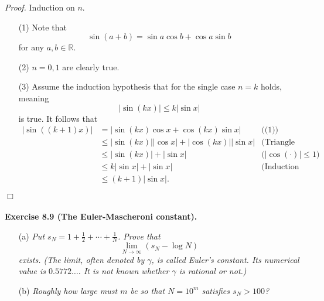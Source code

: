 \documentclass{article}
\begin{document}
\emph{Proof.}
Induction on $n$.
\begin{enumerate}
\item[(1)]
Note that
\[
  \sin(a+b) = \sin a \cos b + \cos a \sin b
\]
for any $a, b \in \mathbb{R}$.
\item[(2)]
$n = 0,1$ are clearly true.
\item[(3)]
Assume the induction hypothesis that for the single case $n = k$ holds,
meaning
\[
  |\sin(kx)| \leq k |\sin x|
\]
is true.
It follows that
\begin{align*}
  |\sin((k+1)x)|
  &= |\sin(kx) \cos x + \cos(kx) \sin x|
    &\text{((1))} \\
  &\leq |\sin(kx)| |\cos x| + |\cos(kx)| |\sin x|
    &\text{(Triangle inequality)} \\
  &\leq |\sin(kx)| + |\sin x|
    &\text{($|\cos(\cdot)| \leq 1$)} \\
  &\leq k |\sin x| + |\sin x|
    &\text{(Induction hypothesis)} \\
  &\leq (k+1)|\sin x|.
\end{align*}
\end{enumerate}
$\Box$ \\\\









\textbf{Exercise 8.9 (The Euler-Mascheroni constant).}
\begin{enumerate}
\item[(a)]
\emph{Put $s_N = 1 + \frac{1}{2} + \cdots + \frac{1}{N}$.
Prove that
\[
  \lim_{N \to \infty}(s_N - \log N)
\]
exists.
(The limit, often denoted by $\gamma$, is called Euler's constant.
Its numerical value is $0.5772\ldots$.
It is not known whether $\gamma$ is rational or not.)}
\item[(b)]
\emph{Roughly how large must $m$ be so that $N = 10^m$ satisfies $s_N > 100$?} \\
\end{enumerate}
\end{document}
